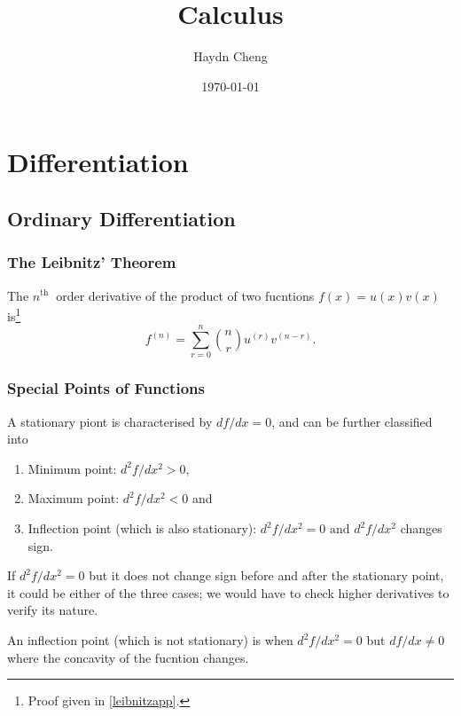 \documentclass[english,a4paper,12pt]{report}
\title{Calculus}
\author{Haydn Cheng}
\date{\today}
\begin{document}
\maketitle
\tableofcontents

\chapter{Differentiation}

\section{Ordinary Differentiation}

\subsection{The Leibnitz' Theorem} \label{leibnitz} 
\begin{theorem}
    The \(n^{\text{th }} \) order derivative of the product of two fucntions \(f(x) = u(x)v(x)\) is\footnote{Proof given in \cref{leibnitzapp}.}  
    \begin{equation}
        f^{(n)} = \sum_{r=0}^{n} \binom{n}{r} u^{(r)} v^{(n-r)}. \label{lei} 
    \end{equation}
\end{theorem}

\subsection{Special Points of Functions}

A stationary piont is characterised by \( df /dx = 0\), and can be further classified into 

\begin{enumerate}
    \item Minimum point: \( d^2f / dx^2 > 0\),
    \item Maximum point: \(d^2f / dx^2 < 0\) and
    \item Inflection point (which is also stationary): \(d^2f / dx^2 = 0 \text { and }  d^2f / dx^2\)  changes sign.
\end{enumerate}

If \(d^2f / dx^2 = 0\) but it does not change sign before and after the stationary point, it could be either of the three cases; we would have to check higher derivatives to verify its nature. 

An inflection point (which is not stationary) is when \(d^2f / dx^2 = 0\) but \(df/dx \neq 0\) where the concavity of the fucntion changes.  
\end{document}
